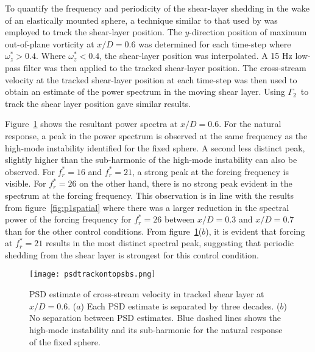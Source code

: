 \documentclass[3p]{elsarticle}
\newcommand{\freqrat}{\ensuremath{f_r^*}}
\newcommand{\gtwo}{\ensuremath{\Gamma_2}}
\newcommand{\wz}{\ensuremath{\omega_z^*}}
\begin{document}
To quantify the frequency and periodicity of the shear-layer shedding in the wake of an elastically mounted sphere, a technique similar to that used by \citet{vanHout2013} was employed to track the shear-layer position. 
The $y$-direction position of maximum out-of-plane vorticity at $x/D=0.6$ was determined for each time-step where $\wz>0.4$.
Where $\wz<0.4$, the shear-layer position was interpolated. 
A 15 Hz low-pass filter was then applied to the tracked shear-layer position. 
The cross-stream velocity at the tracked shear-layer position at each time-step was then used to obtain an estimate of the power spectrum in the moving shear layer. 
Using \gtwo~to track the shear layer position gave similar results. 

Figure~\ref{fig:psdtrackontop} shows the resultant power spectra at $x/D=0.6$. 
For the natural response, a peak in the power spectrum is observed at the same frequency as the high-mode instability identified for the fixed sphere. 
A second less distinct peak, slightly higher than the sub-harmonic of the high-mode instability can also be observed. 
For $\freqrat=16$ and $\freqrat=21$, a strong peak at the forcing frequency is visible. 
For $\freqrat=26$ on the other hand, there is no strong peak evident in the spectrum at the forcing frequency. 
This observation is in line with the results from figure~\ref{fig:p1spatial} where there was a larger reduction in the spectral power of the forcing frequency for $\freqrat=26$ between $x/D=0.3$ and $x/D=0.7$ than for the other control conditions. 
From figure~\ref{fig:psdtrackontop}($b$), it is evident that forcing at $\freqrat=21$ results in the most distinct spectral peak, suggesting that periodic shedding from the shear layer is strongest for this control condition.
%
\begin{figure}
	\centering
	\texttt{[image: psdtrackontopsbs.png]}
	\caption{PSD estimate of cross-stream velocity in tracked shear layer
		at $x/D=0.6$. ($a$) Each PSD estimate is separated by three decades.
		($b$) No separation between PSD estimates. Blue dashed
		lines shows the high-mode instability and its
		sub-harmonic for the natural response of the fixed sphere.}
	\label{fig:psdtrackontop}
\end{figure}
%
\end{document}
